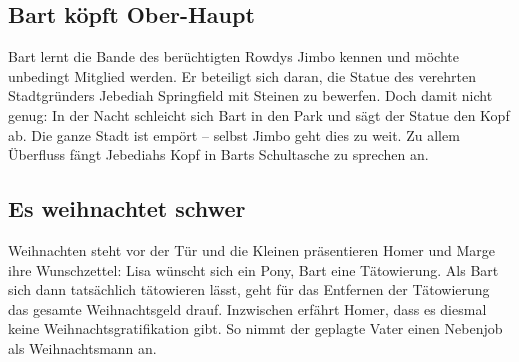 	
\subsection{Bart köpft Ober-Haupt}\label{7G07}
Bart lernt die Bande des berüchtigten Rowdys Jimbo kennen und möchte unbedingt Mitglied werden. Er beteiligt sich daran, die Statue des verehrten Stadtgründers Jebediah Springfield mit Steinen zu bewerfen. Doch damit nicht genug: In der Nacht schleicht sich Bart in den Park und sägt der Statue den Kopf ab. Die ganze Stadt ist empört -- selbst Jimbo geht dies zu weit. Zu allem Überfluss fängt Jebediahs Kopf in Barts Schultasche zu sprechen an.


	
\subsection{Es weihnachtet schwer}\label{7G08}
Weihnachten steht vor der Tür und die Kleinen präsentieren Homer und Marge ihre Wunschzettel: Lisa wünscht sich ein Pony, Bart eine Tätowierung. Als Bart sich dann tatsächlich tätowieren lässt, geht für das Entfernen der Tätowierung das gesamte Weihnachtsgeld drauf. Inzwischen erfährt Homer, dass es diesmal keine Weihnachtsgratifikation gibt. So nimmt der geplagte Vater einen Nebenjob als Weihnachtsmann an.

